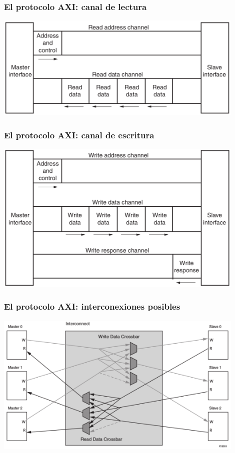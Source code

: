 \documentclass{beamer}
\begin{document}
\begin{frame}
\frametitle{El protocolo AXI: canal de lectura}
\begin{center}
\includegraphics[width=0.9\textwidth]{axi_read_channel}
\end{center}
\end{frame} 

\begin{frame}
\frametitle{El protocolo AXI: canal de escritura}
\begin{center}
\includegraphics[width=0.9\textwidth]{axi_write_channel}
\end{center}
\end{frame} 

\begin{frame}
\frametitle{El protocolo AXI: interconexiones posibles}
\begin{center}
\includegraphics[width=0.9\textwidth]{axi_crossbar}
\end{center}
\end{frame} 
\end{document}
